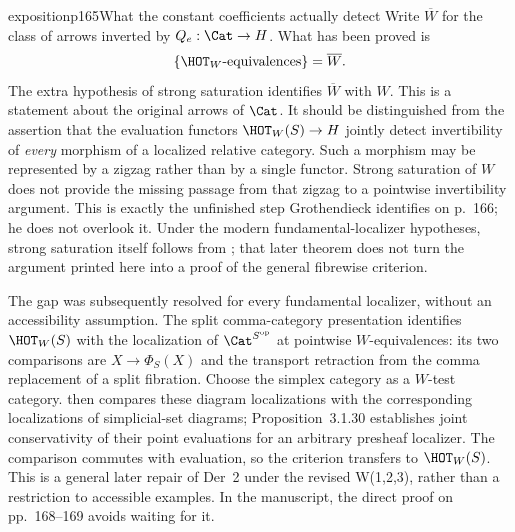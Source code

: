 \begin{dcomment}{exposition}{p165}{What the constant coefficients actually detect}
Write $\overline W$ for the class of arrows inverted by $Q_e:\Cat\to H$. What has been proved is
\[
 \{\HOT_W\text{-equivalences}\}=\overline W.
\]
The extra hypothesis of strong saturation identifies $\overline W$ with $W$. This is a statement about the original arrows of $\Cat$. It should be distinguished from the assertion that the evaluation functors $\HOT_W(S)\to H$ jointly detect invertibility of \emph{every} morphism of a localized relative category. Such a morphism may be represented by a zigzag rather than by a single functor. Strong saturation of $W$ does not provide the missing passage from that zigzag to a pointwise invertibility argument. This is exactly the unfinished step Grothendieck identifies on p.~166; he does not overlook it. Under the modern fundamental-localizer hypotheses, strong saturation itself follows from \citet[Proposition~4.2.4]{Cisinski2006}; that later theorem does not turn the argument printed here into a proof of the general fibrewise criterion.

The gap was subsequently resolved for every fundamental localizer, without an accessibility assumption. The split comma-category presentation identifies $\HOT_W(S)$ with the localization of $\Cat^{S^{\mathrm{op}}}$ at pointwise $W$-equivalences: its two comparisons are $X\to\Phi_S(X)$ and the transport retraction from the comma replacement of a split fibration. Choose the simplex category as a $W$-test category. \citet[Proposition~4.2.7]{Cisinski2006} then compares these diagram localizations with the corresponding localizations of simplicial-set diagrams; Proposition~3.1.30 establishes joint conservativity of their point evaluations for an arbitrary presheaf localizer. The comparison commutes with evaluation, so the criterion transfers to $\HOT_W(S)$. This is a general later repair of Der~2 under the revised W(1,2,3), rather than a restriction to accessible examples. In the manuscript, the direct proof on pp.~168--169 avoids waiting for it.
\end{dcomment}

